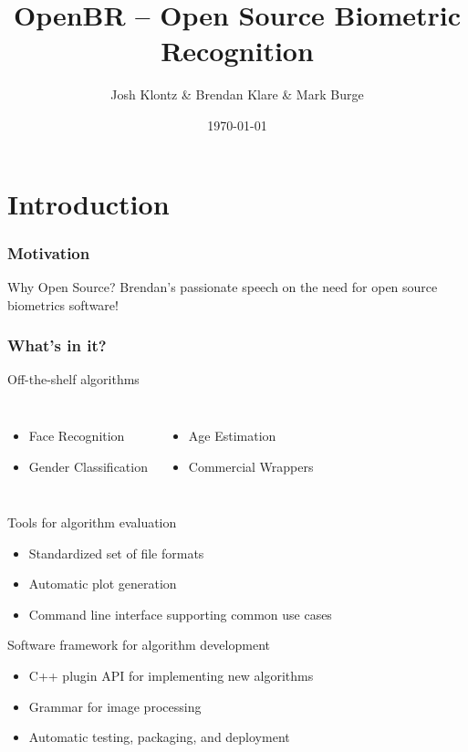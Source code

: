 \documentclass[12pt]{beamer}
\title[OpenBR]{OpenBR -- Open Source Biometric Recognition}
\author[J. Klontz \& B. Klare \& M. Burge]{Josh Klontz \& Brendan Klare \& Mark Burge}
\institute[]
{
www.openbiometrics.org \\
\medskip
{\emph{openbr-dev@googlegroups.com}}
}
\date{\today}
\begin{document}
\begin{frame}
\titlepage
\end{frame}

\section{Introduction}
\begin{frame}
\frametitle{Motivation}
\begin{block}
{Why Open Source?}
Brendan's passionate speech on the need for open source biometrics software!
\end{block}
\end{frame}

\begin{frame}
\frametitle{What's in it?}
\begin{block}{Off-the-shelf algorithms}
  \vspace{-6pt}
  \begin{columns}
    \begin{itemize}
    \item Face Recognition
    \item Gender Classification
    \end{itemize}
    \begin{itemize}
    \item Age Estimation
    \item Commercial Wrappers
    \end{itemize}
  \end{columns}
\end{block}
\pause
\begin{block}{Tools for algorithm evaluation}
  \begin{itemize}
  \item Standardized set of file formats
  \item Automatic plot generation
  \item Command line interface supporting common use cases
  \end{itemize}
\end{block}
\pause
\begin{block}{Software framework for algorithm development}
  \begin{itemize}
  \item C++ plugin API for implementing new algorithms
  \item Grammar for image processing
  \item Automatic testing, packaging, and deployment
  \end{itemize}
\end{block}
\end{frame}
\end{document}

